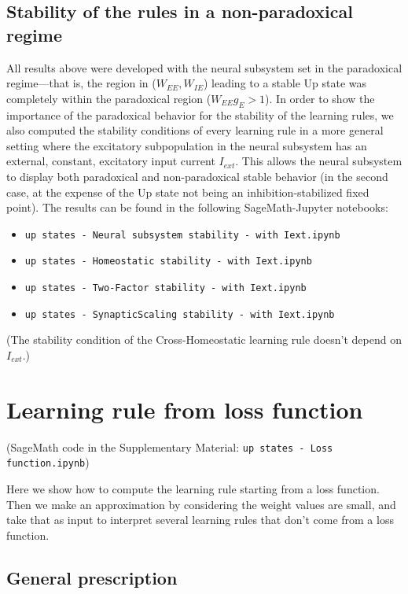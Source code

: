\documentclass[twocolumn]{article}
\newcommand{\EE}{\mathit{EE}}
\newcommand{\IE}{\mathit{IE}}
\newcommand{\ext}{\mathit{ext}}
\begin{document}
\subsection{Stability of the rules in a non-paradoxical regime}
\label{sec.nonparadoxical}

All results above were developed with the neural subsystem set in the paradoxical regime---that is, the region in ($W_{\EE},W_{\IE}$) leading to a stable Up state was completely within the paradoxical region ($W_{\EE}g_E > 1$). In order to show the importance of the paradoxical behavior for the stability of the learning rules, we also computed the stability conditions of every learning rule in a more general setting where the excitatory subpopulation in the neural subsystem has an external, constant, excitatory input current $I_{\ext}$. This allows the neural subsystem to display both paradoxical and non-paradoxical stable behavior (in the second case, at the expense of the Up state not being an inhibition-stabilized fixed point). The results can be found in the following SageMath-Jupyter notebooks:
\begin{itemize}
\item[] {\tt up states - Neural subsystem stability - with Iext.ipynb}
\item[] {\tt up states - Homeostatic stability - with Iext.ipynb}
\item[] {\tt up states - Two-Factor stability - with Iext.ipynb}
\item[] {\tt up states - SynapticScaling stability - with Iext.ipynb}
\end{itemize}

\noindent (The stability condition of the Cross-Homeostatic learning rule doesn't depend on $I_{\ext}$.)



\section{Learning rule from loss function}

(SageMath code in the Supplementary Material: {\tt up states - Loss function.ipynb})

Here we show how to compute the learning rule starting from a loss function. Then we make an approximation by considering the weight values are small, and take that as input to interpret several learning rules that don't come from a loss function.


\subsection{General prescription}
\end{document}
